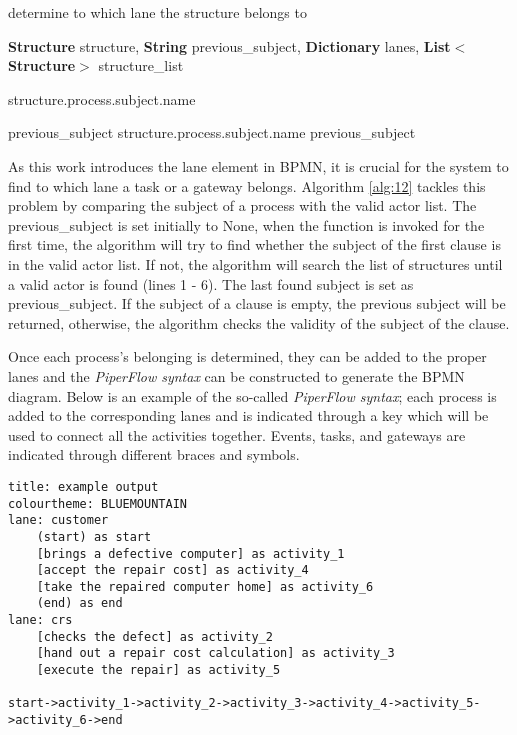 \begin{algorithm}
\caption{determine to which lane the structure belongs to}
\label{alg:12}
	\begin{algorithmic} [1]
		\REQUIRE \textbf{Structure} structure, \textbf{String} previous\_subject, \textbf{Dictionary} lanes, \textbf{List$<$Structure$>$} structure\_list
		
		\RETURN structure.process.subject.name
		\ENDIF
		\ENDFOR
		\ELSE
		
		\RETURN previous\_subject
		\ELSE
		\RETURN structure.process.subject.name
		\ELSE
		\RETURN previous\_subject
		\ENDIF
		\ENDIF		
		\ENDIF
		
	\end{algorithmic}
\end{algorithm}

As this work introduces the lane element in BPMN, it is crucial for the system to find to which lane a task or a gateway belongs. Algorithm \ref{alg:12} tackles this problem by comparing the subject of a process with the valid actor list. The previous\_subject is set initially to None, when the function is invoked for the first time, the algorithm will try to find whether the subject of the first clause is in the valid actor list. If not, the algorithm will search the list of structures until a valid actor is found (lines 1 - 6). The last found subject is set as previous\_subject. If the subject of a clause is empty, the previous subject will be returned, otherwise, the algorithm checks the validity of the subject of the clause.

Once each process's belonging is determined, they can be added to the proper lanes and the \textit{PiperFlow syntax} can be constructed to generate the BPMN diagram. Below is an example of the so-called \textit{PiperFlow syntax}; each process is added to the corresponding lanes and is indicated through a key which will be used to connect all the activities together. Events, tasks, and gateways are indicated through different braces and symbols. 

\begin{lstlisting}
title: example output
colourtheme: BLUEMOUNTAIN
lane: customer
	(start) as start
	[brings a defective computer] as activity_1
	[accept the repair cost] as activity_4
	[take the repaired computer home] as activity_6
	(end) as end
lane: crs
	[checks the defect] as activity_2
	[hand out a repair cost calculation] as activity_3
	[execute the repair] as activity_5

start->activity_1->activity_2->activity_3->activity_4->activity_5->activity_6->end
\end{lstlisting}

